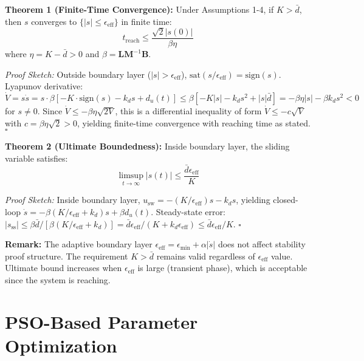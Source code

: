 \documentclass[conference]{IEEEtran}
\begin{document}
\textbf{Theorem 1 (Finite-Time Convergence):} Under Assumptions 1-4, if $K > \bar{d}$, then $s$ converges to $\{|s| \leq \epsilon_{\text{eff}}\}$ in finite time:
\begin{equation}
t_{\text{reach}} \leq \frac{\sqrt{2}|s(0)|}{\beta\eta}
\end{equation}
where $\eta = K - \bar{d} > 0$ and $\beta = \mathbf{L}\mathbf{M}^{-1}\mathbf{B}$.

\textit{Proof Sketch:} Outside boundary layer ($|s| > \epsilon_{\text{eff}}$), $\text{sat}(s/\epsilon_{\text{eff}}) = \text{sign}(s)$. Lyapunov derivative: $\dot{V} = s\dot{s} = s \cdot \beta[-K \cdot \text{sign}(s) - k_d s + d_u(t)] \leq \beta[-K|s| - k_d s^2 + |s|\bar{d}] = -\beta\eta|s| - \beta k_d s^2 < 0$ for $s \neq 0$. Since $\dot{V} \leq -\beta\eta\sqrt{2V}$, this is a differential inequality of form $\dot{V} \leq -c\sqrt{V}$ with $c = \beta\eta\sqrt{2} > 0$, yielding finite-time convergence with reaching time as stated. $\square$

\textbf{Theorem 2 (Ultimate Boundedness):} Inside boundary layer, the sliding variable satisfies:
\begin{equation}
\limsup_{t \to \infty} |s(t)| \leq \frac{\bar{d} \epsilon_{\text{eff}}}{K}
\end{equation}

\textit{Proof Sketch:} Inside boundary layer, $u_{\text{sw}} = -(K/\epsilon_{\text{eff}})s - k_d s$, yielding closed-loop $\dot{s} = -\beta(K/\epsilon_{\text{eff}} + k_d)s + \beta d_u(t)$. Steady-state error: $|s_{\text{ss}}| \leq \beta \bar{d}/[\beta(K/\epsilon_{\text{eff}} + k_d)] = \bar{d}\epsilon_{\text{eff}}/(K + k_d\epsilon_{\text{eff}}) \leq \bar{d}\epsilon_{\text{eff}}/K$. $\square$

\textbf{Remark:} The adaptive boundary layer $\epsilon_{\text{eff}} = \epsilon_{\min} + \alpha|\dot{s}|$ does not affect stability proof structure. The requirement $K > \bar{d}$ remains valid regardless of $\epsilon_{\text{eff}}$ value. Ultimate bound increases when $\epsilon_{\text{eff}}$ is large (transient phase), which is acceptable since the system is reaching.

\section{PSO-Based Parameter Optimization}
\end{document}
